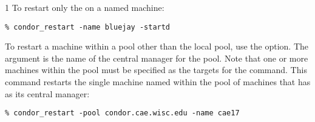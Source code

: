 \begin{ManPage}{\label{man-condor-restart}}{1}
To restart only the  on a named machine:
\begin{verbatim}
% condor_restart -name bluejay -startd
\end{verbatim}

To restart a machine within a pool
other than the local pool, use the  option.
The argument is the name of the central manager for the pool.
Note that one or more machines within the pool must be
specified as the targets for the command.
This command restarts
the single machine named  within the
pool of machines that has  as
its central manager:
\begin{verbatim}
% condor_restart -pool condor.cae.wisc.edu -name cae17
\end{verbatim}

\end{ManPage}

